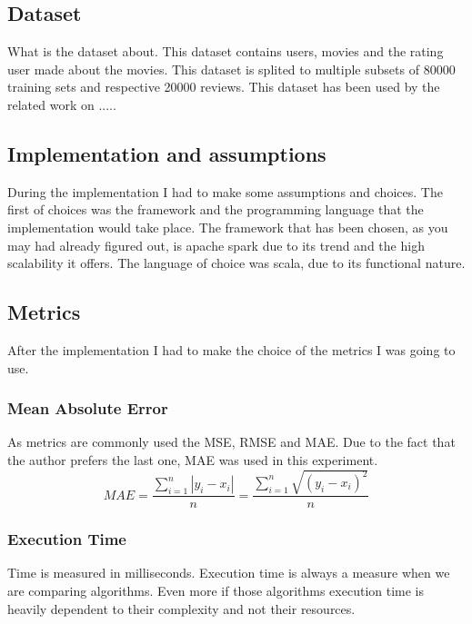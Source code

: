 \subsection{Dataset}
What is the dataset about. This dataset contains users, movies and the rating user made about the movies.
This dataset is splited to multiple subsets of 80000 training sets and respective 20000 reviews.
This dataset has been used by the related work on .....
\cite{MovieLens:3}

\subsection{Implementation and assumptions}
During the implementation I had to make some assumptions and choices. The first of choices was the framework and the programming language that the implementation would take place. The framework that has been chosen, as you may had already figured out, is apache spark due to its trend and the high scalability it offers. The language of choice was scala, due to its functional nature.
\subsection{Metrics}
After the implementation I had to make the choice of the metrics I was going to use.
\subsubsection{Mean Absolute Error}
As metrics are commonly used the MSE, RMSE and MAE. Due to the fact that the author prefers the last one, MAE was used in this experiment.
\begin{equation}
MAE = \frac{\sum_{i=1}^{n}{|y_{i}-x_{i}|} }{n} = \frac{\sum_{i=1}^{n}\sqrt{{(y_{i}-x_{i})}^{2}}}{n}
\end{equation}
\subsubsection{Execution Time}
Time is measured in milliseconds.
Execution time is always a measure when we are comparing algorithms. 
Even more if those algorithms execution time is heavily dependent to their complexity and not their resources.
